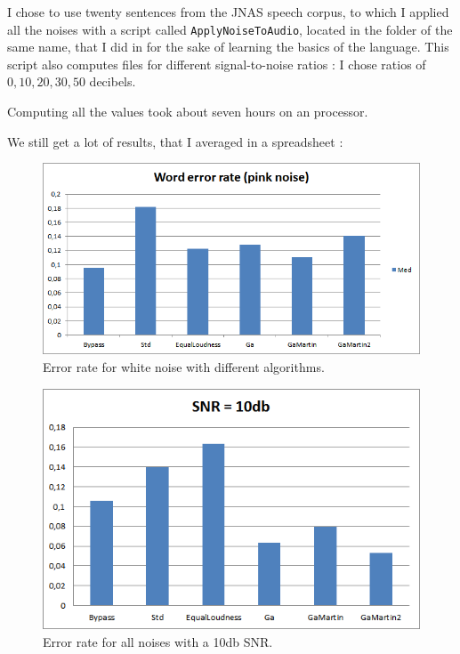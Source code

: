 I chose to use twenty sentences from the \ac{JNAS} speech corpus, to which I applied all the noises with a script called \texttt{ApplyNoiseToAudio}, located in the folder of the same name, that I did in  for the sake of learning the basics of the language.
This script also computes files for different signal-to-noise ratios : I chose ratios of $0, 10, 20, 30, 50$ decibels.

Computing all the values took about seven hours on an  processor.

We still get a lot of results, that I averaged in a spreadsheet :

\begin{figure}[H]
\begin{center}
\includegraphics[scale=0.60]{images/worderrorratenoise.png}
\caption{Error rate for white noise with different algorithms.}
\end{center}
\end{figure}


\begin{figure}[H]
\begin{center}
\includegraphics[scale=0.7]{images/snr.png}
\caption{Error rate for all noises with a 10db SNR.}
\end{center}
\end{figure}


